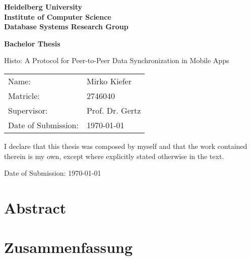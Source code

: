 \documentclass[
     12pt,         %
     a4paper,      %
     BCOR10mm,     %
     DIV14,        %
     liststotoc,   %
     bibtotoc,     %
     idxtotoc,     %
     ]{scrreprt}
\begin{document}
\begin{titlepage}


\vspace*{1cm}
\begin{center}
\vspace*{3cm}
\textbf{ 
\Large Heidelberg University\\
\smallskip
\Large Institute of Computer Science\\
\smallskip
\Large Database Systems Research Group\\
\smallskip
}

\vspace{3cm}

\textbf{\large Bachelor Thesis} %

\vspace{0.5\baselineskip}
{\huge{
Histo: A Protocol for Peer-to-Peer Data Synchronization in Mobile Apps
} \par}
\end{center}

\vfill 

{\large
\begin{tabular}[l]{ll}
Name: & Mirko Kiefer\\
Matricle: & 2746040\\
Supervisor: & Prof. Dr. Gertz\\
Date of Submission: & \today
\end{tabular}
}

\end{titlepage}

\onehalfspacing

\thispagestyle{empty}

\vspace*{100pt}
I declare that this thesis was composed by myself and that the work contained therein is my
own, except where explicitly stated otherwise in the text.

\vspace*{50pt}


Date of Submission: \today
\newpage

\chapter*{Abstract}

\newpage

\chapter*{Zusammenfassung}

\newpage
\end{document}
